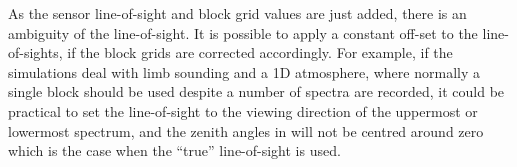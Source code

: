 As the sensor line-of-sight and block grid values are just added,
there is an ambiguity of the line-of-sight. It is possible to apply a
constant off-set to the line-of-sights, if the block grids are
corrected accordingly. For example, if the simulations deal with limb
sounding and a 1D atmosphere, where normally a single block should be
used despite a number of spectra are recorded, it could be practical
to set the line-of-sight to the viewing direction of the uppermost or
lowermost spectrum, and the zenith angles in 
will not be centred around zero which is the case when the ``true''
line-of-sight is used.

